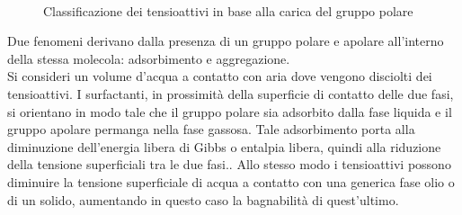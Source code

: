 \begin{figure}[htbp]
    \centering
     \quad
      \\
      \quad
\caption{Classificazione dei tensioattivi in base alla carica del gruppo polare}
\label{fig:surfactants-classification}
\end{figure}

Due fenomeni derivano dalla presenza di un gruppo polare e apolare all'interno della stessa molecola: adsorbimento e aggregazione.\\
Si consideri un volume d'acqua a contatto con aria dove vengono disciolti dei tensioattivi. I surfactanti, in prossimità della superficie di contatto delle due fasi, si orientano in modo tale che il gruppo polare sia adsorbito dalla fase liquida e il gruppo apolare permanga nella fase gassosa. Tale adsorbimento porta alla diminuzione dell'energia libera di Gibbs o entalpia libera, quindi alla riduzione della tensione superficiali tra le due fasi.. Allo stesso modo i tensioattivi possono diminuire la tensione superficiale di acqua a contatto con una generica fase olio o di un solido, aumentando in questo caso la bagnabilità di quest'ultimo.

